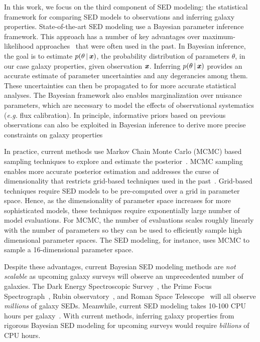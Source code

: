 In this work, we focus on the third component of SED modeling: the statistical
framework for comparing SED models to observations and inferring galaxy
properties. 
State-of-the-art SED modeling use a Bayesian parameter inference framework.
This approach has a number of key advantages over maximum-likelihood 
approaches~\citep[\emph{e.g.}][]{cidfernandes2005, tojeiro2007, koleva2008} 
that were often used in the past.
In Bayesian inference, the goal is to estimate $p(\theta\,|\,\textbf{\textit{x}})$, the
probability distribution of parameters $\theta$, in our case galaxy
properties, given observation $\textbf{\textit{x}}$. 
Inferring $p(\theta\,|\,\textbf{\textit{x}})$ provides an accurate estimate of parameter 
uncertainties and any degerancies among them.
These uncertainties can then be propagated to for more accurate statistical
analyses. 
The Bayesian framework also enables marginalization over nuisance parameters,
which are necessary to model the effects of observational systematics
(\emph{e.g.} flux calibration).
In principle, informative priors based on previous observations can also be
exploited in Bayesian inference to derive more precise constraints on galaxy
properties 

In practice, current methods use Markov Chain Monte Carlo (MCMC) based sampling
techniques to explore and estimate the
posterior~\citep{acquaviva2011, chevallard2016, carnall2017, leja2017}. 
MCMC sampling enables more accurate posterior estimation and addresses the
curse of dimensionality that restricts grid-based techniques used in the
past~\citep{kauffmann2003a, burgarella2005, salim2007, dacunha2008}.
Grid-based techniques require SED models to be pre-computed over a grid in
parameter space.
Hence, as the dimensionality of parameter space increases for more
sophisticated models, these techniques require exponentially large number of
model evaluations. 
For MCMC, the number of evaluations scales roughly linearly with the number of
parameters so they can be used to efficiently sample high dimensional parameter
spaces. 
The \cite{johnson2021} SED modeling, for instance, uses MCMC to sample a
16-dimensional parameter space. 

Despite these advantages, current Bayesian SED modeling methods are \emph{not
scalable} as upcoming galaxy surveys will observe an unprecedented number of
galaxies.
The Dark Energy Spectroscopic Survey~\citep[DESI;][]{desicollaboration2016},
the Prime Focus Spectrograph~\citep[PFS;][]{takada2014},
Rubin observatory~\citep{ivezic2019}, and Roman Space
Telescope~\citep{spergel2015} will all observe \emph{millions} of galaxy SEDs. 
Meanwhile, current SED modeling takes 10-100 CPU hours per
galaxy~\citep[\emph{e.g.}][]{carnall2019, tacchella2021}.
With current methods, inferring galaxy properties from rigorous Bayesian SED
modeling for upcoming surveys  would require \emph{billions} of CPU hours. 

